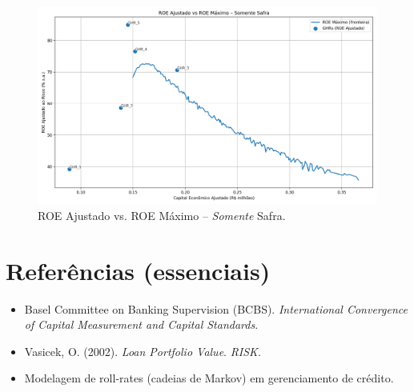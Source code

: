 \documentclass[11pt,a4paper]{article}
\newcommand{\1}{\mathbf{1}}
\begin{document}
\begin{figure}[H]\centering
\includegraphics[width=.85\linewidth]{roe_maximo_safra.png}
\caption{ROE Ajustado vs. ROE Máximo – \emph{Somente} Safra.}
\end{figure}

\section*{Referências (essenciais)}
\begin{itemize}[noitemsep]
  \item Basel Committee on Banking Supervision (BCBS). \emph{International Convergence of Capital Measurement and Capital Standards}.
  \item Vasicek, O. (2002). \emph{Loan Portfolio Value}. \textit{RISK}.
  \item Modelagem de roll-rates (cadeias de Markov) em gerenciamento de crédito.
\end{itemize}

\clearpage
\appendix
\end{document}
